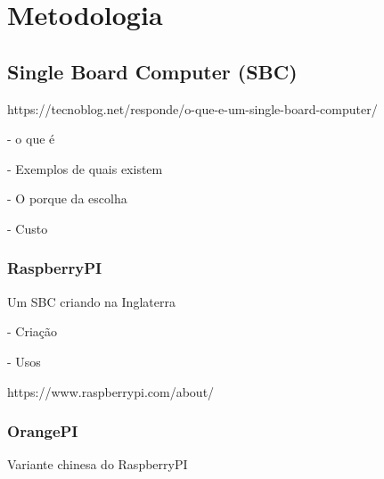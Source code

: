 \section{Metodologia}

\subsection{Single Board Computer (SBC)}

https://tecnoblog.net/responde/o-que-e-um-single-board-computer/

 - o que é

 - Exemplos de quais existem

 - O porque da escolha

  - Custo

\subsubsection{RaspberryPI}

Um SBC criando na Inglaterra

 - Criação

 - Usos

https://www.raspberrypi.com/about/

\subsubsection{OrangePI}

Variante chinesa do RaspberryPI


